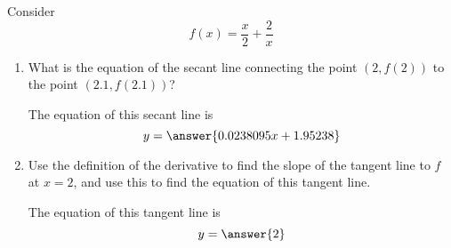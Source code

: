 \documentclass[handout]{ximera}
\begin{document}
\begin{exercise}
Consider 
\[
f(x) = \frac{x}{2}+\frac{2}{x}
\]

\begin{enumerate}
\item What is the equation of the secant line connecting the point $(2,f(2))$ to the point $(2.1,f(2.1))$? 

The equation of this secant line is
$$ y = \answer{0.0238095x+1.95238 }$$ 

\item  Use the definition of the derivative to find the slope of the tangent line to $f$ at $x=2$, and use this to find the equation of this tangent line.


The equation of this tangent line is
$$ y = \answer{2}$$ 


\end{enumerate}

\end{exercise}
\end{document}
